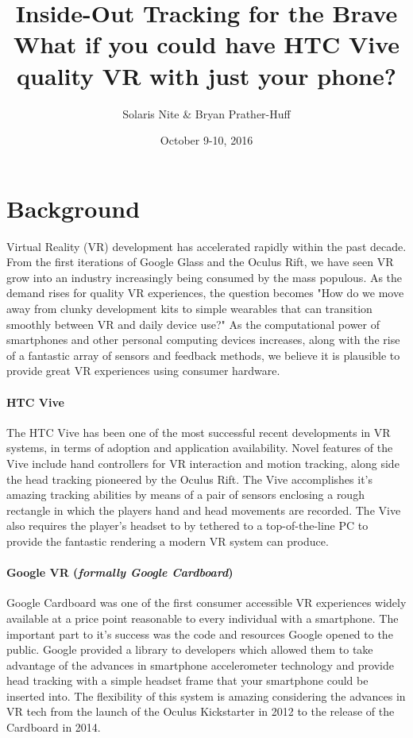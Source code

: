 \documentclass{report}
\title{Inside-Out Tracking for the Brave \\ \small{What if you could have HTC Vive quality VR with just your phone?}}
\author{Solaris Nite \& Bryan Prather-Huff}
\date{October 9-10, 2016}
\begin{document}
	\maketitle
	
	\section*{Background}
	Virtual Reality (VR) development has accelerated rapidly within the past decade. From the first iterations of Google Glass and the Oculus Rift, we have seen VR grow into an industry increasingly being consumed by the mass populous. As the demand rises for quality VR experiences, the question becomes "How do we move away from clunky development kits to simple wearables that can transition smoothly between VR and daily device use?" As the computational power of smartphones and other personal computing devices increases, along with the rise of a fantastic array of sensors and feedback methods, we believe it is plausible to provide great VR experiences using consumer hardware.
	
	\paragraph*{HTC Vive}
	The HTC Vive has been one of the most successful recent developments in VR systems, in terms of adoption and application availability. Novel features of the Vive include hand controllers for VR interaction and motion tracking, along side the head tracking pioneered by the Oculus Rift. The Vive accomplishes it's amazing tracking abilities by means of a pair of sensors enclosing a rough rectangle in which the players hand and head movements are recorded. The Vive also requires the player's headset to by tethered to a top-of-the-line PC to provide the fantastic rendering a modern VR system can produce.
	
	\paragraph*{Google VR (\textit{formally Google Cardboard})}
	Google Cardboard was one of the first consumer accessible VR experiences widely available at a price point reasonable to every individual with a smartphone. The important part to it's success was the code and resources Google opened to the public. Google provided a library to developers which allowed them to take advantage of the advances in smartphone accelerometer technology and provide head tracking with a simple headset frame that your smartphone could be inserted into. The flexibility of this system is amazing considering the advances in VR tech from the launch of the Oculus Kickstarter in 2012 to the release of the Cardboard in 2014.
	
\end{document}
